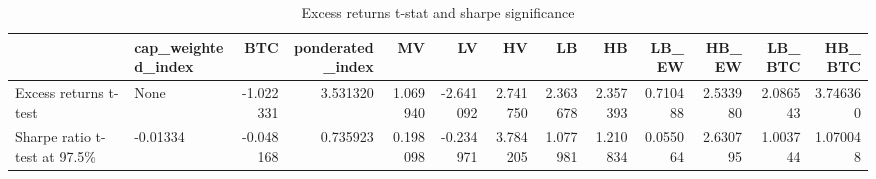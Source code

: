 \begin{table}
\centering
\caption{Excess returns t-stat and sharpe significance}
\label{signif100}
\begin{tabular}{llrrrrrrrrrrr}
\toprule
{} & cap\_weighted\_index &       BTC &  ponderated\_index &        MV &        LV &        HV &        LB &        HB &     LB\_EW &     HB\_EW &    LB\_BTC &    HB\_BTC \\
\midrule
Excess returns t-test        &               None & -1.022331 &          3.531320 &  1.069940 & -2.641092 &  2.741750 &  2.363678 &  2.357393 &  0.710488 &  2.533980 &  2.086543 &  3.746360 \\
Sharpe ratio t-test at 97.5\% &           -0.01334 & -0.048168 &          0.735923 &  0.198098 & -0.234971 &  3.784205 &  1.077981 &  1.210834 &  0.055064 &  2.630795 &  1.003744 &  1.070048 \\
\bottomrule
\end{tabular}
\end{table}
